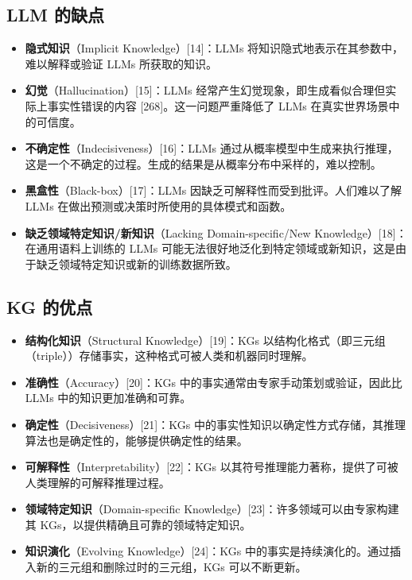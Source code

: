 \documentclass[11pt,UTF8,fontset=fandol]{ctexart}
\begin{document}
\subsection*{LLM 的缺点}

\begin{itemize}
    \item \textbf{隐式知识}（Implicit Knowledge）[14]：LLMs 将知识隐式地表示在其参数中，难以解释或验证 LLMs 所获取的知识。
    \item \textbf{幻觉}（Hallucination）[15]：LLMs 经常产生幻觉现象，即生成看似合理但实际上事实性错误的内容 [268]。这一问题严重降低了 LLMs 在真实世界场景中的可信度。
    \item \textbf{不确定性}（Indecisiveness）[16]：LLMs 通过从概率模型中生成来执行推理，这是一个不确定的过程。生成的结果是从概率分布中采样的，难以控制。
    \item \textbf{黑盒性}（Black-box）[17]：LLMs 因缺乏可解释性而受到批评。人们难以了解 LLMs 在做出预测或决策时所使用的具体模式和函数。
    \item \textbf{缺乏领域特定知识/新知识}（Lacking Domain-specific/New Knowledge）[18]：在通用语料上训练的 LLMs 可能无法很好地泛化到特定领域或新知识，这是由于缺乏领域特定知识或新的训练数据所致。
\end{itemize}

\subsection*{KG 的优点}

\begin{itemize}
    \item \textbf{结构化知识}（Structural Knowledge）[19]：KGs 以结构化格式（即三元组（triple））存储事实，这种格式可被人类和机器同时理解。
    \item \textbf{准确性}（Accuracy）[20]：KGs 中的事实通常由专家手动策划或验证，因此比 LLMs 中的知识更加准确和可靠。
    \item \textbf{确定性}（Decisiveness）[21]：KGs 中的事实性知识以确定性方式存储，其推理算法也是确定性的，能够提供确定性的结果。
    \item \textbf{可解释性}（Interpretability）[22]：KGs 以其符号推理能力著称，提供了可被人类理解的可解释推理过程。
    \item \textbf{领域特定知识}（Domain-specific Knowledge）[23]：许多领域可以由专家构建其 KGs，以提供精确且可靠的领域特定知识。
    \item \textbf{知识演化}（Evolving Knowledge）[24]：KGs 中的事实是持续演化的。通过插入新的三元组和删除过时的三元组，KGs 可以不断更新。
\end{itemize}
\end{document}

